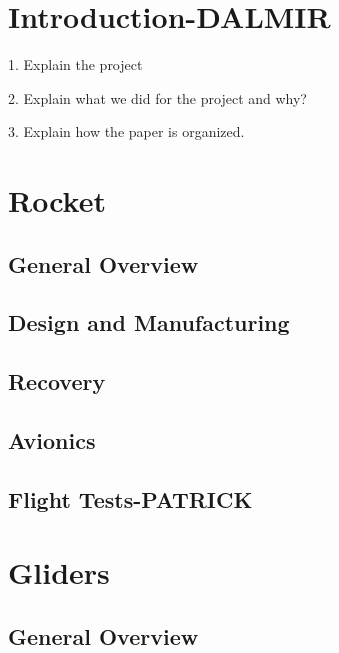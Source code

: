 \documentclass[]{iac}
\begin{document}
\maketitle
\section{Introduction-DALMIR}

1. Explain the project

2. Explain what we did for the project and why?

3. Explain how the paper is organized.



\section{Rocket}

\subsection{General Overview}



\subsection{Design and Manufacturing}



\subsection{Recovery}

\subsection{Avionics}


\subsection{Flight Tests-PATRICK}


\section{Gliders}

\subsection{General Overview}
\end{document}

